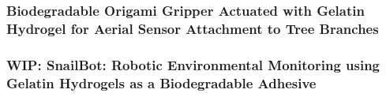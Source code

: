 \subsubsection{Biodegradable Origami Gripper Actuated with Gelatin Hydrogel for Aerial Sensor Attachment to Tree Branches \cite{Geckeler2023b}}

\subsubsection{WIP: SnailBot: Robotic Environmental Monitoring using Gelatin Hydrogels as a Biodegradable Adhesive}

